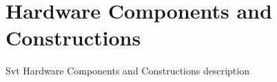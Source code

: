 \section{Hardware Components and Constructions}

Svt Hardware Components and Constructions description

